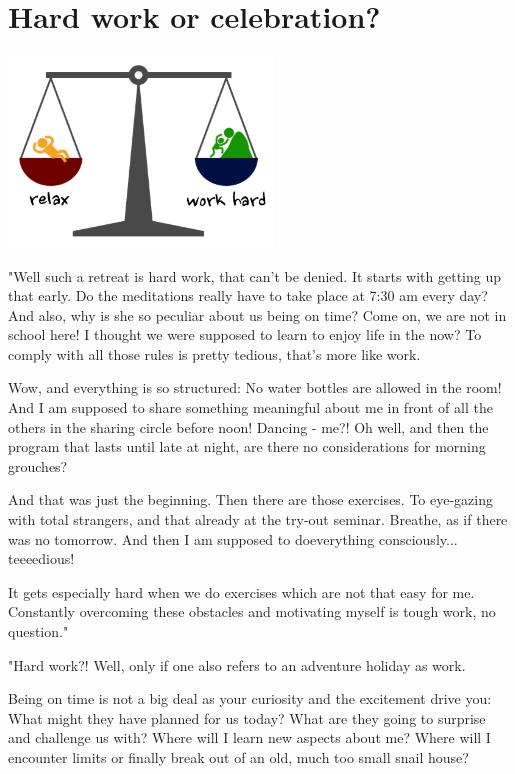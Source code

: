 \section{Hard work or celebration?}

\begin{center}
\includegraphics[width=7cm]{images/10_work.png}
\end{center}

"Well such a retreat is hard work, that can't be denied. It starts with getting up that early. Do the meditations really have to take place at 7:30 am every day? And also, why is she so peculiar about us being on time? Come on, we are not in school here! I thought we were supposed to learn to enjoy life in the now? To comply with all those rules is pretty tedious, that's more like work.

Wow, and everything is so structured: No water bottles are allowed in the room! And I am supposed to share something meaningful about me in front of all the others in the sharing circle before noon! Dancing - me?! Oh well, and then the program that lasts until late at night, are there no considerations for morning grouches?

And that was just the beginning. Then there are those exercises. To eye-gazing with total strangers, and that already at the try-out seminar. Breathe, as if there was no tomorrow. And then I am supposed to doeverything consciously... teeeedious!

It gets especially hard when we do exercises which are not that easy for me. Constantly overcoming these obstacles and motivating myself is tough work, no question."

"Hard work?! Well, only if one also refers to an adventure holiday as work.

Being on time is not a big deal as your curiosity and the excitement drive you: What might they have planned for us today? What are they going to surprise and challenge us with? Where will I learn new aspects about me? Where will I encounter limits or finally break out of an old, much too small snail house?

